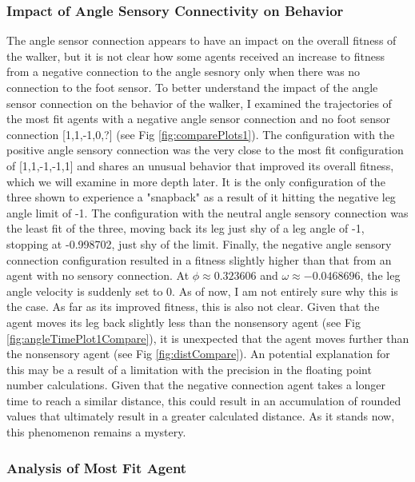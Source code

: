 \documentclass{article}
\begin{document}
\subsubsection{Impact of Angle Sensory Connectivity on Behavior}

The angle sensor connection appears to have an impact on the overall fitness of the walker, but it is not clear how some agents received an increase to fitness from a negative connection to the angle sesnory only when there was no connection to the foot sensor. To better understand the impact of the angle sensor connection on the behavior of the walker, I examined the trajectories of the most fit agents with a negative angle sensor connection and no foot sensor connection [1,1,-1,0,?] (see Fig \ref{fig:comparePlots1}). The configuration with the positive angle sensory connection was the very close to the most fit configuration of [1,1,-1,-1,1] and shares an unusual behavior that improved its overall fitness, which we will examine in more depth later. It is the only configuration of the three shown to experience a "snapback" as a result of it hitting the negative leg angle limit of -1. The configuration with the neutral angle sensory connection was the least fit of the three, moving back its leg just shy of a leg angle of -1, stopping at -0.998702, just shy of the limit. Finally, the negative angle sensory connection configuration resulted in a fitness slightly higher than that from an agent with no sensory connection. At \(\phi \approx 0.323606 \) and \(\omega \approx -0.0468696\), the leg angle velocity is suddenly set to 0. As of now, I am not entirely sure why this is the case. As far as its improved fitness, this is also not clear. Given that the agent moves its leg back slightly less than the nonsensory agent (see Fig \ref{fig:angleTimePlot1Compare}), it is unexpected that the agent moves further than the nonsensory agent (see Fig \ref{fig:distCompare}). An potential explanation for this may be a result of a limitation with the precision in the floating point number calculations. Given that the negative connection agent takes a longer time to reach a similar distance, this could result in an accumulation of rounded values that ultimately result in a greater calculated distance. As it stands now, this phenomenon remains a mystery.

\subsubsection{Analysis of Most Fit Agent}
\end{document}
